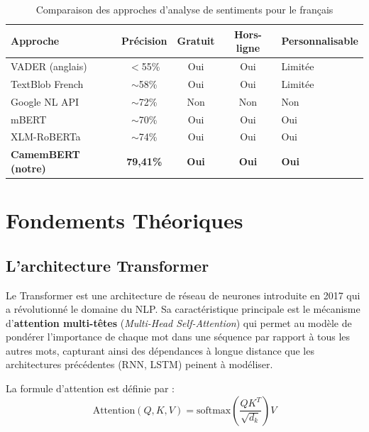\begin{table}[H]
\centering
\caption{Comparaison des approches d'analyse de sentiments pour le français}
\label{tab:comparaison_approches}
\renewcommand{\arraystretch}{1.4}
\begin{tabular}{lcccp{3.5cm}}
\toprule
\rowcolor{bleuprincipal!15}
\textbf{Approche} & \textbf{Précision} & \textbf{Gratuit} &
\textbf{Hors-ligne} & \textbf{Personnalisable} \\
\midrule
VADER (anglais) & $<$55\% & Oui & Oui & Limitée \\
\rowcolor{gray!8}
TextBlob French & $\sim$58\% & Oui & Oui & Limitée \\
Google NL API & $\sim$72\% & Non & Non & Non \\
\rowcolor{gray!8}
mBERT & $\sim$70\% & Oui & Oui & Oui \\
XLM-RoBERTa & $\sim$74\% & Oui & Oui & Oui \\
\rowcolor{vertprincipal!15}
\textbf{CamemBERT (notre)} & \textbf{79,41\%} & \textbf{Oui} &
\textbf{Oui} & \textbf{Oui} \\
\bottomrule
\end{tabular}
\end{table}

\section{Fondements Théoriques}

\subsection{L'architecture Transformer}

Le Transformer \cite{vaswani2017attention} est une architecture de réseau
de neurones introduite en 2017 qui a révolutionné le domaine du NLP. Sa
caractéristique principale est le mécanisme d'\textbf{attention multi-têtes}
(\textit{Multi-Head Self-Attention}) qui permet au modèle de pondérer
l'importance de chaque mot dans une séquence par rapport à tous les autres
mots, capturant ainsi des dépendances à longue distance que les architectures
précédentes (RNN, LSTM) peinent à modéliser.

La formule d'attention est définie par :
\begin{equation}
\text{Attention}(Q, K, V) = \text{softmax}\left(\frac{QK^T}{\sqrt{d_k}}\right) V
\label{eq:attention}
\end{equation}

